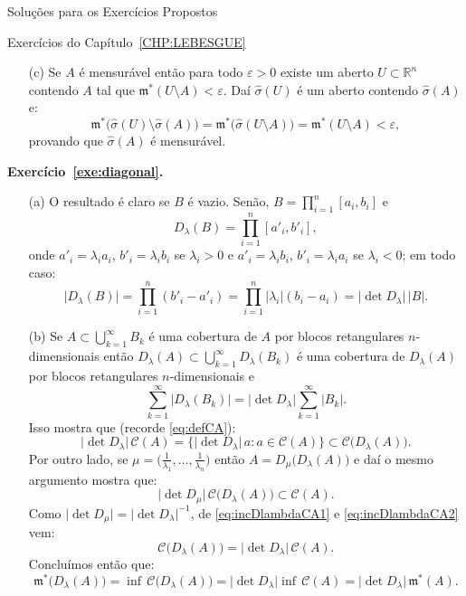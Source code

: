 \documentclass[oneside,final,11pt]{amsbook}
\newcommand{\R}{\mathds R}
\newcommand{\leb}{\mathfrak m}
\theoremstyle{remark}\newtheorem{exercise}{Exercício}[chapter]
\theoremstyle{remark}\newtheorem{*exercise}[exercise]{\hbox to 0pt{\hskip 0pt minus 1fil*}Exercício}
\theoremstyle{definition}\newtheorem{exdefin}{Definição}[chapter]
\theoremstyle{plain}\newtheorem{teo}{Teorema}[section]
\theoremstyle{plain}\newtheorem{lem}[teo]{Lema}
\theoremstyle{plain}\newtheorem{prop}[teo]{Proposição}
\theoremstyle{plain}\newtheorem{cor}[teo]{Corolário}
\theoremstyle{definition}\newtheorem{defin}[teo]{Definição}
\theoremstyle{remark}\newtheorem{rem}[teo]{Observação}
\theoremstyle{definition}\newtheorem{notation}[teo]{Notação}
\theoremstyle{definition}\newtheorem{convention}[teo]{Convenção}
\theoremstyle{definition}\newtheorem{example}[teo]{Exemplo}
\numberwithin{section}{chapter}
\numberwithin{equation}{section}
\begin{document}
\begin{chapter}{Soluções para os Exercícios Propostos}
\begin{section}{Exercícios do Capítulo~\ref{CHP:LEBESGUE}}
\begin{itemize}
\smallskip

\item[(c)] Se $A$ é mensurável então para todo $\varepsilon>0$ existe um aberto $U\subset\R^n$
contendo $A$ tal que $\leb^*(U\setminus A)<\varepsilon$. Daí $\widehat\sigma(U)$ é um aberto
contendo $\widehat\sigma(A)$ e:
\[\leb^*\big(\widehat\sigma(U)\setminus\widehat\sigma(A)\big)=\leb^*\big(\widehat\sigma(U\setminus A)\big)
=\leb^*(U\setminus A)<\varepsilon,\]
provando que $\widehat\sigma(A)$ é mensurável.
\end{itemize}

\medskip

\textbf{Exercício~\ref{exe:diagonal}.}
\begin{itemize}
\item[(a)] O resultado é claro se $B$ é vazio. Senão, $B=\prod_{i=1}^n[a_i,b_i]$ e
\[D_\lambda(B)=\prod_{i=1}^n[a'_i,b'_i],\]
onde $a'_i=\lambda_ia_i$, $b'_i=\lambda_ib_i$ se $\lambda_i>0$ e $a'_i=\lambda_ib_i$,
$b'_i=\lambda_ia_i$ se $\lambda_i<0$; em todo caso:
\[\vert D_\lambda(B)\vert=\prod_{i=1}^n(b'_i-a'_i)=\prod_{i=1}^n\vert\lambda_i\vert(b_i-a_i)
=\vert\det D_\lambda\vert\,\vert B\vert.\]

\smallskip

\item[(b)] Se $A\subset\bigcup_{k=1}^\infty B_k$ é uma cobertura de $A$ por blocos retangulares
$n$-dimensionais então $D_\lambda(A)\subset\bigcup_{k=1}^\infty D_\lambda(B_k)$
é uma cobertura de $D_\lambda(A)$ por blocos retangulares $n$-dimensionais
e
\[\sum_{k=1}^\infty\vert D_\lambda(B_k)\vert=\vert\det D_\lambda\vert\sum_{k=1}^\infty\vert B_k\vert.\]
Isso mostra que (recorde \eqref{eq:defCA}):
\begin{equation}\label{eq:incDlambdaCA1}
\vert\det D_\lambda\vert\,\mathcal C(A)=\big\{\vert\det D_\lambda\vert\,a:a\in\mathcal C(A)\big\}
\subset\mathcal C\big(D_\lambda(A)\big).
\end{equation}
Por outro lado, se $\mu=\big(\frac1{\lambda_1},\ldots,\frac1{\lambda_n}\big)$ então
$A=D_\mu\big(D_\lambda(A)\big)$ e daí o mesmo argumento mostra que:
\begin{equation}\label{eq:incDlambdaCA2}
\vert\det D_\mu\vert\,\mathcal C\big(D_\lambda(A)\big)\subset\mathcal C(A).
\end{equation}
Como $\vert\det D_\mu\vert=\vert\det D_\lambda\vert^{-1}$, de \eqref{eq:incDlambdaCA1}
e \eqref{eq:incDlambdaCA2} vem:
\[\mathcal C\big(D_\lambda(A)\big)=\vert\det D_\lambda\vert\,\mathcal C(A).\]
Concluímos então que:
\[\leb^*\big(D_\lambda(A)\big)=\inf\,\mathcal C\big(D_\lambda(A)\big)
=\vert\det D_\lambda\vert\inf\,\mathcal C(A)=\vert\det D_\lambda\vert\,\leb^*(A).\]


\end{itemize}
\end{section}
\end{chapter}
\end{document}
